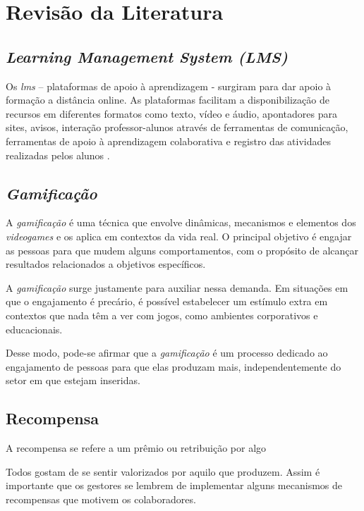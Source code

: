 \chapter{Revisão da Literatura}

\section{\textit{Learning Management System (LMS)}}
Os \textit{\ac{lms}} – plataformas de apoio à aprendizagem - surgiram para dar apoio à formação a distância online. As plataformas facilitam a disponibilização de recursos em diferentes formatos como texto, vídeo e áudio, apontadores para sites, avisos, interação professor-alunos através de ferramentas de comunicação, ferramentas de apoio à aprendizagem colaborativa e registro das atividades realizadas pelos alunos \cite{rentabilizacao-ens-basico-e-secundario:2007}.


\section{\textit{Gamificação}}
A \textit{gamificação} é uma técnica que envolve dinâmicas, mecanismos e elementos dos \textit{videogames} e os aplica em contextos da vida real. O principal objetivo é engajar as pessoas para que mudem alguns comportamentos, com o propósito de alcançar resultados relacionados a objetivos específicos.


A \textit{gamificação} surge justamente para auxiliar nessa demanda. Em situações em que o engajamento é precário, é possível estabelecer um estímulo extra em contextos que nada têm a ver com jogos, como ambientes corporativos e educacionais.
\cite{gamificacao-corporativa:2017}


Desse modo, pode-se afirmar que a \textit{gamificação} é um processo dedicado ao engajamento de pessoas para que elas produzam mais, independentemente do setor em que estejam inseridas.
\cite{gamificacao-corporativa:2017}


\section{Recompensa}
A recompensa se refere a um prêmio ou retribuição por algo \cite{dicio-recompensa:2009}


Todos gostam de se sentir valorizados por aquilo que produzem. Assim é importante que os gestores se lembrem de implementar alguns mecanismos de recompensas que motivem os colaboradores. \cite{gamificacao-corporativa:2017}


